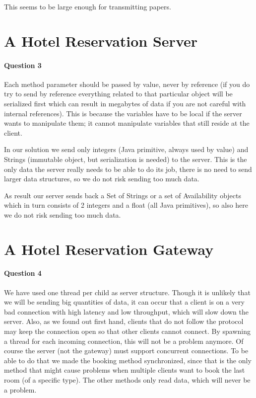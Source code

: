 \documentclass[a4paper,10pt]{article}
\begin{document}
This seems to be large enough for transmitting papers.


\section{A Hotel Reservation Server}
\paragraph{Question 3}
Each method parameter should be passed by value, never by reference (if you do try to send by reference everything related to that particular object will be serialized first which can result in megabytes of data if you are not careful with internal references). This is because the variables have to be local if the server wants to manipulate them; it cannot manipulate variables that still reside at the client.

In our solution we send only integers (Java primitive, always used by value) and Strings (immutable object, but serialization is needed) to the server. This is the only data the server really needs to be able to do its job, there is no need to send larger data structures, so we do not risk sending too much data.

As result our server sends back a Set of Strings or a set of Availability objects which in turn consists of 2 integers and a float (all Java primitives), so also here we do not risk sending too much data.

\section{A Hotel Reservation Gateway}
\paragraph{Question 4}
We have used one thread per child as server structure. Though it is unlikely that we will be sending big quantities of data, it can occur that a client is on a very bad connection with high latency and low throughput, which will slow down the server. Also, as we found out first hand, clients that do not follow the protocol may keep the connection open so that other clients cannot connect. By spawning a thread for each incoming connection, this will not be a problem anymore. Of course the server (not the gateway) must support concurrent connections. To be able to do that we made the booking method synchronized, since that is the only method that might cause problems when multiple clients want to book the last room (of a specific type). The other methods only read data, which will never be a problem.
\end{document}
